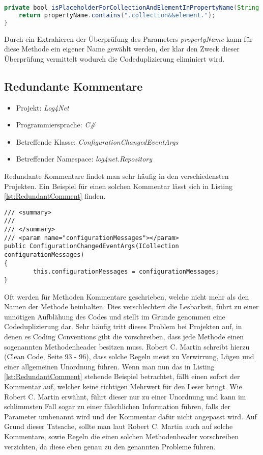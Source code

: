 \begin{lstlisting}[language=Java, caption=Boolscher Ausdruck neu, label=lst:BoolStatement4]
private bool isPlaceholderForCollectionAndElementInPropertyName(String propertyName) {
	return propertyName.contains(".collection&&element.");
}
\end{lstlisting}

\SuperPar Durch ein Extrahieren der Überprüfung des Parameters \textit{propertyName} kann für diese Methode ein eigener Name gewählt werden, der klar den Zweck dieser Überprüfung vermittelt wodurch die Codeduplizierung eliminiert wird. 

\subsection{Redundante Kommentare}
\begin{itemize}
	\item Projekt: \textit{Log4Net}
	\item Programmiersprache: \textit{C\#}
	\item Betreffende Klasse: \textit{ConfigurationChangedEventArgs}
	\item Betreffender Namespace: \textit{log4net.Repository}
\end{itemize}

\SuperPar Redundante Kommentare findet man sehr häufig in den verschiedensten Projekten. Ein Beispiel für einen solchen Kommentar lässt sich in Listing \ref{lst:RedundantComment}  finden.


\begin{lstlisting}[language={[Sharp]C}, caption=Beispiele für überflüssige Kommentare, label=lst:RedundantComment]
/// <summary>
/// 
/// </summary>
/// <param name="configurationMessages"></param>
public ConfigurationChangedEventArgs(ICollection configurationMessages)
{
		this.configurationMessages = configurationMessages;
}
\end{lstlisting}

\SuperPar Oft werden für Methoden Kommentare geschrieben, welche nicht mehr als den Namen der Methode beinhalten. Dies verschlechtert die Lesbarkeit, führt zu einer unnötigen Aufblähung des Codes und stellt im Grunde genommen eine Codeduplizierung dar. Sehr häufig tritt dieses Problem bei Projekten auf, in denen es Coding Conventions gibt die vorschreiben, dass jede Methode einen sogenannten Methodenheader besitzen muss. Robert C. Martin schreibt hierzu (Clean Code, Seite 93 - 96), dass solche Regeln meist zu Verwirrung, Lügen und einer allgemeinen Unordnung führen.  Wenn man nun das in Listing \ref{lst:RedundantComment} stehende Beispiel betrachtet, fällt einen sofort der Kommentar auf, welcher keine richtigen Mehrwert für den Leser bringt. Wie Robert C. Martin erwähnt, führt dieser nur zu einer Unordnung und kann im schlimmsten Fall sogar zu einer fälschlichen Information führen, falls der Parameter umbenannt wird und der Kommentar dafür nicht angepasst wird. Auf Grund dieser Tatsache, sollte man laut Robert C. Martin auch auf solche Kommentare, sowie Regeln die einen solchen Methodenheader vorschreiben verzichten, da diese eben genau zu den genannten Probleme führen.

